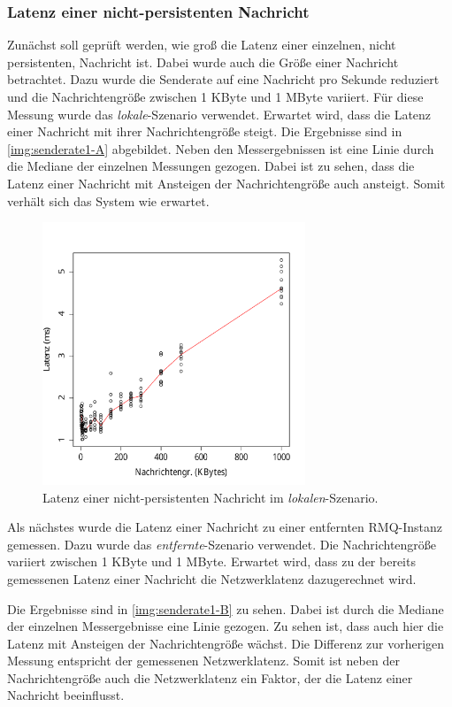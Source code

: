 \subsubsection{Latenz einer nicht-persistenten Nachricht}
\label{sec:oneMsgLatency}
Zunächst soll geprüft werden, wie groß die Latenz einer einzelnen, nicht persistenten, Nachricht ist. Dabei wurde auch die Größe einer Nachricht betrachtet. Dazu wurde die Senderate auf eine Nachricht pro Sekunde reduziert und die Nachrichtengröße zwischen 1 KByte und 1 MByte variiert. Für diese Messung wurde das \textit{lokale}-Szenario verwendet. Erwartet wird, dass die Latenz einer Nachricht mit ihrer Nachrichtengröße steigt.
Die Ergebnisse sind in \autoref{img:senderate1-A} abgebildet. Neben den Messergebnissen ist eine Linie durch die Mediane der einzelnen Messungen gezogen. Dabei ist zu sehen, dass die Latenz einer Nachricht mit Ansteigen der Nachrichtengröße auch ansteigt. Somit verhält sich das System wie erwartet.

\begin{figure}[t]
\center
  \includegraphics[width=0.7\textwidth]{images/measurement/rate-limit-1-A.pdf}
  \caption{Latenz einer nicht-persistenten Nachricht im \textit{lokalen}-Szenario.}
  \label{img:senderate1-A}
\end{figure}

Als nächstes wurde die Latenz einer Nachricht zu einer entfernten RMQ-Instanz gemessen. Dazu wurde das \textit{entfernte}-Szenario verwendet. Die Nachrichtengröße variiert zwischen 1 KByte und 1 MByte. Erwartet wird, dass zu der bereits gemessenen Latenz einer Nachricht die Netzwerklatenz dazugerechnet wird.

Die Ergebnisse sind in \autoref{img:senderate1-B} zu sehen. Dabei ist durch die Mediane der einzelnen Messergebnisse eine Linie gezogen. Zu sehen ist, dass auch hier die Latenz mit Ansteigen der Nachrichtengröße wächst. Die Differenz zur vorherigen Messung entspricht der gemessenen Netzwerklatenz.
Somit ist neben der Nachrichtengröße auch die Netzwerklatenz ein Faktor, der die Latenz einer Nachricht beeinflusst.


